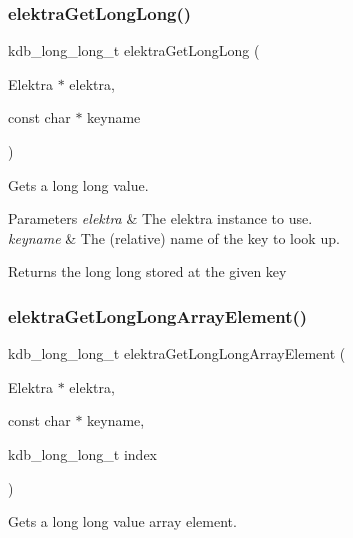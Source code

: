 \subsubsection{\texorpdfstring{elektra\+Get\+Long\+Long()}{elektraGetLongLong()}}
{\footnotesize\ttfamily kdb\+\_\+long\+\_\+long\+\_\+t elektra\+Get\+Long\+Long (\begin{DoxyParamCaption}\item[{Elektra $\ast$}]{elektra,  }\item[{const char $\ast$}]{keyname }\end{DoxyParamCaption})}



Gets a long long value. 


\begin{DoxyParams}{Parameters}
{\em elektra} & The elektra instance to use. \\
\hline
{\em keyname} & The (relative) name of the key to look up. \\
\hline
\end{DoxyParams}
\begin{DoxyReturn}{Returns}
the long long stored at the given key 
\end{DoxyReturn}
\mbox{\label{group__highlevel_gaa55dfc31eaca932f963461eb1a1e1f86}} 
\subsubsection{\texorpdfstring{elektra\+Get\+Long\+Long\+Array\+Element()}{elektraGetLongLongArrayElement()}}
{\footnotesize\ttfamily kdb\+\_\+long\+\_\+long\+\_\+t elektra\+Get\+Long\+Long\+Array\+Element (\begin{DoxyParamCaption}\item[{Elektra $\ast$}]{elektra,  }\item[{const char $\ast$}]{keyname,  }\item[{kdb\+\_\+long\+\_\+long\+\_\+t}]{index }\end{DoxyParamCaption})}



Gets a long long value array element. 



